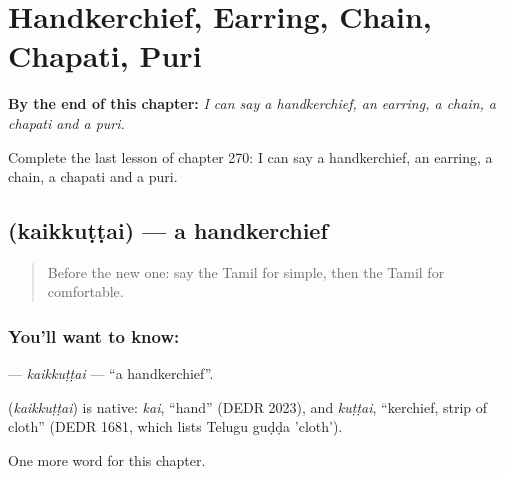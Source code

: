 
\chapter{Handkerchief, Earring, Chain, Chapati, Puri}
\label{ch:ta-handkerchief-earring-chain-chapati-puri}

\begin{chapteropening}
\textbf{By the end of this chapter:} \emph{I can say a handkerchief, an earring, a chain, a chapati and a puri.}

Complete the last lesson of chapter 270: I can say a handkerchief, an earring, a chain, a chapati and a puri.
\end{chapteropening}

\section[\texorpdfstring{\ta{கைக்குட்டை} (kaikkuṭṭai)}{கைக்குட்டை (kaikkuṭṭai)}]{ (kaikkuṭṭai) — a handkerchief}

\label{lesson:TA-C270-kaikkuttai}



\begin{quote}
Before the new one: say the Tamil for simple, then the Tamil for comfortable.
\end{quote}

\subsection*{You'll want to know: }
\textbf{} — \emph{kaikkuṭṭai} — \textquotedblleft{}a handkerchief\textquotedblright{}.

\begin{cousinweb}
\textbf{} (\emph{kaikkuṭṭai}) is native: \emph{kai}, \textquotedblleft{}hand\textquotedblright{} (DEDR 2023), and \emph{kuṭṭai}, \textquotedblleft{}kerchief, strip of cloth\textquotedblright{} (DEDR 1681, which lists Telugu guḍḍa 'cloth').
\end{cousinweb}

\begin{grammarlens}[title={What you've built}]
One more word for this chapter.
\end{grammarlens}

